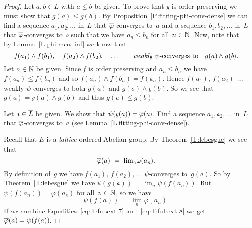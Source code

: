 \documentclass[main.tex]{subfiles}
\begin{document}
\begin{proof}
Let $a,b\in L$ with $a\leq b$ be given.
To prove that $g$ is order preserving 
we must show that $g(a)\leq g(b)$.
By Proposition~\ref{P:fitting-phi-conv-dense}
we can find a sequence $a_1,a_2,\dotsc$ in~$L$
that $\overline\varphi$-converges to~$a$
and a sequence $b_1,b_2,\dotsc$ in~$L$
that $\overline\varphi$-converges to~$b$
such that we have $a_n \leq b_n$ for all~$n\in\mathbb{N}$.
Now, note that  by Lemma~\ref{L:phi-conv-inf}
we know that
\begin{equation*}
f(a_1) \wedge f(b_1),\quad f(a_2)\wedge f(b_2),\quad \dotsc
\qquad\text{\emph{weakly} $\psi$-converges to}\quad g(a)\wedge g(b).
\end{equation*}
Let $n\in \mathbb{N}$ be given.
Since $f$ is order preserving
and $a_n \leq b_n$
we have $f(a_n)\leq f(b_n)$
and so $f(a_n) \wedge f(b_n) = f(a_n)$.
Hence  $f(a_1),\,f(a_2),\,\dotsc$
weakly $\psi$-converges to both $g(a)$ and $g(a)\wedge g(b)$.
So we see that $g(a) = g(a)\wedge g(b)$ 
and thus $g(a)\leq g(b)$.

Let $a\in\overline L$ be given.
We show that $\psi(g(a)) = \overline\varphi(a)$.
Find a sequence $a_1,a_2,\dotsc$ in~$L$
that $\overline\varphi$-converges to~$a$
(see Lemma~\ref{L:fitting-phi-conv-dense}).

Recall that $E$ is a \emph{lattice} ordered Abelian group.
By Theorem~\ref{T:lebesgue}
we see that
\begin{equation}
\label{eq:T:fubext-7}
\overline\varphi(a) \ = \ \textstyle{\lim_n} \varphi(a_n).
\end{equation}
By definition of~$g$
we have $f(a_1),\,f(a_2),\,\dotsc$
$\psi$-converges to~$g(a)$.
So by Theorem~\ref{T:lebesgue}
we have  $\psi(g(a)) = \lim_n \psi(f(a_n)) $.
But $\psi(f(a_n)) = \varphi(a_n)$ for all~$n\in\mathbb{N}$,
so we have
\begin{equation}
\label{eq:T:fubext-8}
\psi(f(a))
\ =\  \textstyle{\lim_n} \varphi(a_n).
\end{equation}
If we combine Equalities~\eqref{eq:T:fubext-7}
and~\eqref{eq:T:fubext-8} we get
$\overline\varphi(a) = \psi(f(a))$.
\end{proof}
\end{document}
